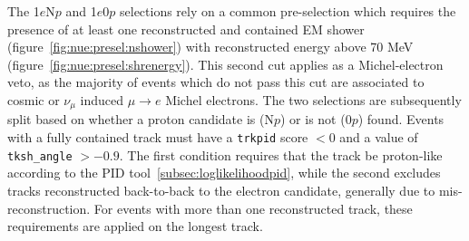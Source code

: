\documentclass[a4paper]{article}
\begin{document}
The 1$e$N$p$ and 1$e$0$p$ selections rely on a common pre-selection which requires the presence of at least one reconstructed and contained EM shower (figure~\ref{fig:nue:presel:nshower}) with reconstructed energy above 70 MeV (figure~\ref{fig:nue:presel:shrenergy}). This second cut applies as a Michel-electron veto, as the majority of events which do not pass this cut are associated to cosmic or $\nu_{\mu}$ induced $\mu \rightarrow e$ Michel electrons. The two selections are subsequently split based on whether a proton candidate is (N$p$) or is not (0$p$) found. Events with a fully contained track must have a \texttt{trkpid} score $< 0$ and a value of \texttt{tksh\_angle} $> -0.9$. The first condition requires that the track be proton-like according to the PID tool~\ref{subsec:loglikelihoodpid}, while the second excludes tracks reconstructed back-to-back to the electron candidate, generally due to mis-reconstruction. For events with more than one reconstructed track, these requirements are applied on the longest track.
\end{document}

